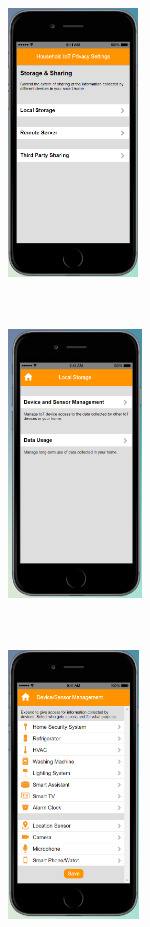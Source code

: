 \begin{figure}
	\centering
	\begin{subfigure}[t]{0.19\textwidth}
		\centering
		\includegraphics[height=2.8in]{figures/ui2allOff1.png}
	\end{subfigure}%
	~~~~~~
	\begin{subfigure}[t]{0.19\textwidth}
		\centering
		\includegraphics[height=2.8in]{figures/ui2allOffLocal.png}
	\end{subfigure}%
	~~~~~~
	\begin{subfigure}[t]{0.19\textwidth}
		\centering
		\includegraphics[height=2.8in]{figures/ui2allOff2.png}

\end{subfigure}
\end{figure}
